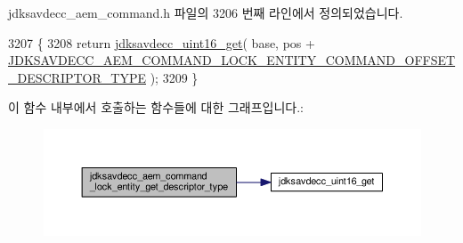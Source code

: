 jdksavdecc\+\_\+aem\+\_\+command.\+h 파일의 3206 번째 라인에서 정의되었습니다.


\begin{DoxyCode}
3207 \{
3208     \textcolor{keywordflow}{return} \hyperlink{group__endian_ga3fbbbc20be954aa61e039872965b0dc9}{jdksavdecc\_uint16\_get}( base, pos + 
      \hyperlink{group__command__lock__entity_ga6f928332cad3c37d4fa173ec3f958e1d}{JDKSAVDECC\_AEM\_COMMAND\_LOCK\_ENTITY\_COMMAND\_OFFSET\_DESCRIPTOR\_TYPE}
       );
3209 \}
\end{DoxyCode}


이 함수 내부에서 호출하는 함수들에 대한 그래프입니다.\+:
\nopagebreak
\begin{figure}[H]
\begin{center}
\leavevmode
\includegraphics[width=350pt]{group__command__lock__entity_ga4e90852d171513d0347947869b00d7c5_cgraph}
\end{center}
\end{figure}




